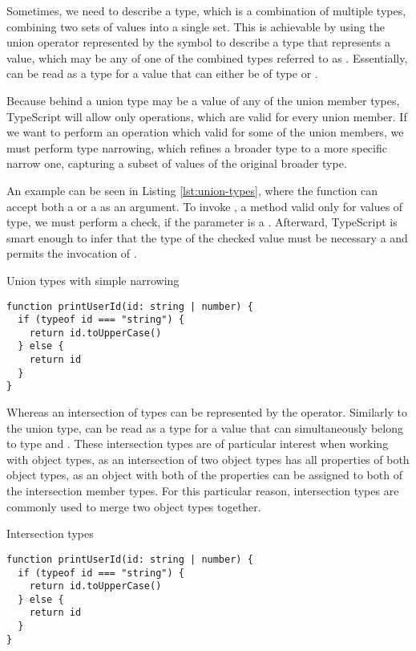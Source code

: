 Sometimes, we need to describe a type, which is a combination of multiple types, combining two sets of values into a single set. This is achievable by using the union operator represented by the \code{|} symbol to describe a type that represents a value, which may be any of one of the combined types referred to as  \cite{DocumentationEverydayTypes}. Essentially,  can be read as a type for a value that can either be of type  or .

Because behind a union type may be a value of any of the union member types, TypeScript will allow only operations, which are valid for every union member. If we want to perform an operation which valid for some of the union members, we must perform type narrowing, which refines a broader type to a more specific narrow one, capturing a subset of values of the original broader type.

An example can be seen in Listing \ref{lst:union-types}, where the function  can accept both a  or a  as an argument. To invoke , a method valid only for values of  type, we must perform a check, if the parameter is a . Afterward, TypeScript is smart enough to infer that the type of the checked value must be necessary a  and permits the invocation of .

\begin{listing}[h]
  \caption{Union types with simple narrowing}\label{lst:union-types}
  \begin{verbatim}
function printUserId(id: string | number) {
  if (typeof id === "string") {
    return id.toUpperCase()
  } else {
    return id
  }
}
  \end{verbatim}
\end{listing}

Whereas an intersection of types can be represented by the \code{&} operator. Similarly to the union type,  can be read as a type for a value that can simultaneously belong to type  and . These intersection types are of particular interest when working with object types, as an intersection of two object types has all properties of both object types, as an object with both of the properties can be assigned to both of the intersection member types. For this particular reason, intersection types are commonly used to merge two object types together.

\begin{listing}[h]
  \caption{Intersection types}\label{lst:intersection-types}
  \begin{verbatim}
function printUserId(id: string | number) {
  if (typeof id === "string") {
    return id.toUpperCase()
  } else {
    return id
  }
}
  \end{verbatim}
\end{listing}

